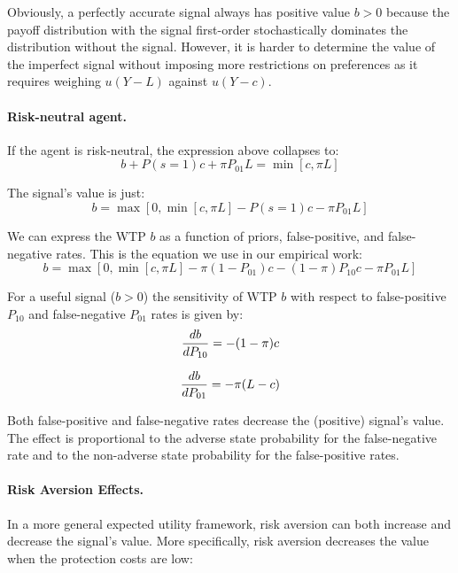 \documentclass[12pt,a4paper]{article}
\begin{document}
Obviously, a perfectly accurate signal always has positive value $b>0$ because the payoff distribution with the signal first-order stochastically dominates the distribution without the signal. 
However, it is harder to determine the value of the imperfect signal without imposing more restrictions on preferences as it requires weighing $u(Y-L)$ against $u(Y-c)$.


\paragraph{Risk-neutral agent.} If the agent is risk-neutral, the expression above collapses to:
$$b+P(s=1)c+\pi P_{01}L=\min[c,\pi L]$$

The signal's value is just:
\begin{equation}
b=\max[0,\min[c,\pi L]-P(s=1)c-\pi P_{01}L]
\end{equation}

We can express the WTP $b$ as a function of priors, false-positive, and false-negative rates. This is the equation we use in our empirical work:
\begin{equation}
b=\max[0,\min[c,\pi L]-\pi (1-P_{01})c-(1-\pi)P_{10}c-\pi P_{01}L]
\end{equation}\label{eq:rnWTP}

For  a useful signal ($b>0$) the sensitivity of WTP $b$ with respect to false-positive $P_{10}$ and false-negative $P_{01}$ rates is given by:
\begin{equation}
{db\over dP_{10}}=-(1-\pi)c
\end{equation}

\begin{equation}
{db\over dP_{01}}=-\pi(L-c)
\end{equation}
\vspace{10pt}

Both false-positive and false-negative rates decrease the (positive) signal's value. The effect is proportional to the adverse state probability for the false-negative rate and to the non-adverse state probability for the false-positive rates.

\paragraph{Risk Aversion Effects.} In a more general expected utility framework, risk aversion can both increase and decrease the signal's value. More specifically, risk aversion decreases the value when the protection costs are low: 
\end{document}
